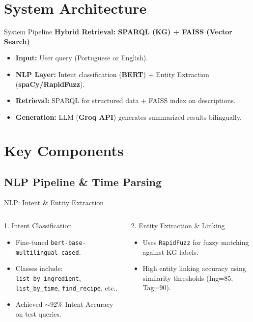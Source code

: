 \documentclass[t, 10pt, handout, aspectratio=169]{beamer}
\begin{document}
\section{System Architecture}
\begin{frame}{System Pipeline}
  \textbf{Hybrid Retrieval: SPARQL (KG) + FAISS (Vector Search)}
  
  \vspace{0.5em}
  \begin{itemize}
    \item \textbf{Input:} User query (Portuguese or English).
    \item \textbf{NLP Layer:} Intent classification (\textbf{BERT}) + Entity Extraction (\textbf{spaCy/RapidFuzz}).
    \item \textbf{Retrieval:} SPARQL for structured data + FAISS index on descriptions.
    \item \textbf{Generation:} LLM (\textbf{Groq API}) generates summarized results bilingually.
  \end{itemize}
\end{frame}

\section{Key Components}
\subsection{NLP Pipeline \& Time Parsing}
\begin{frame}{NLP: Intent \& Entity Extraction}
  \begin{columns}
      \begin{block}{1. Intent Classification}
        \begin{itemize}
          \item Fine-tuned \texttt{bert-base-multilingual-cased}.
          \item Classes include: \texttt{list\_by\_ingredient}, \texttt{list\_by\_time}, \texttt{find\_recipe}, etc..
          \item Achieved $\sim$92\% Intent Accuracy on test queries.
        \end{itemize}
      \end{block}
      
      \begin{block}{2. Entity Extraction \& Linking}
        \begin{itemize}
          \item Uses \texttt{RapidFuzz} for fuzzy matching against KG labels.
          \item High entity linking accuracy using similarity thresholds (Ing=85, Tag=90).
        \end{itemize}
      \end{block}
  \end{columns}
\end{frame}
\end{document}
